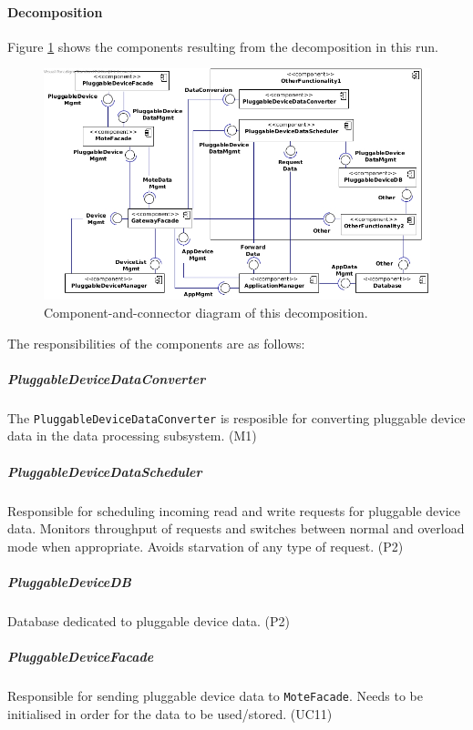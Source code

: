     \paragraph{Decomposition}
        Figure \ref{fig:it2-cc_main} shows the components resulting from the
        decomposition in this run.

        \begin{figure}[!h]
        	\centering
            \includegraphics[width=1\textwidth]{images/component-diagram-2}
        	\caption{Component-and-connector diagram of this decomposition.}
            \label{fig:it2-cc_main}
        \end{figure}

        \noindent The responsibilities of the components are as follows:

    \subparagraph{PluggableDeviceDataConverter}
        The \texttt{PluggableDeviceDataConverter} is resposible for converting
        pluggable device data in the data processing subsystem. (M1)

    \subparagraph{PluggableDeviceDataScheduler}
        Responsible for scheduling incoming read and write requests for
        pluggable device data. Monitors throughput of requests and switches
        between normal and overload mode when appropriate. Avoids starvation
        of any type of request. (P2)

    \subparagraph{PluggableDeviceDB}
        Database dedicated to pluggable device data. (P2)

    \subparagraph{PluggableDeviceFacade}
        Responsible for sending pluggable device data to \texttt{MoteFacade}.
        Needs to be initialised in order for the data to be used/stored. (UC11)


